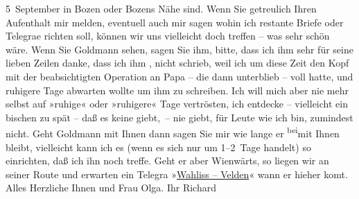 \begin{ledgroupsized}[t]{13cm}
                  5 September in Bozen oder Bozens Nähe sind.\pend
           \pstart
           {\pb}Wenn Sie getreulich Ihren
               Aufenthalt mir melden, eventuell auch mir sagen wohin ich restante Briefe oder
                  Telegra{\geminationm}e richten soll, können wir uns vielleicht doch treffen – was sehr schön wäre.\pend
           \pstart
           {\pb}Wenn Sie Goldmann sehen, sagen Sie ihm, bitte, dass ich ihm sehr für
               seine lieben Zeilen danke, dass ich ihm \label{K_L01701-1v}\label{K_L01701-1h}, nicht schrieb, weil ich um diese Zeit den Kopf mit der beabsichtigten
               Operation an Papa – die dann
               unterblieb – voll hatte, und ruhigere Tage abwarten wollte um ihm zu schreiben. Ich
               will mich aber nie mehr selbst auf »ruhige« oder »ruhigere« Tage vertrösten, ich {\pb}entdecke – vielleicht ein bischen
               zu spät – daß es keine giebt, – nie giebt, für Leute wie ich bin, zumindest
               nicht.\pend
           \pstart
           Geht Goldmann mit Ihnen dann sagen Sie mir wie
               lange er \substVorne{}\textsuperscript{bei}\substDazwischen{}mit\substHinten{} Ihnen bleibt, vielleicht kann ich es (wenn {\pb}es sich nur um 1–2 Tage handelt) so
               einrichten, daß ich ihn noch treffe. Geht er aber Wienwärts, so liegen wir an seiner Route und erwarten ein Telegra{\geminationm} »\uline{Wahliss – Velden}« wann er hieher ko{\geminationm}mt. Alles Herzliche Ihnen und
               Frau Olga.\pend
           \pstart Ihr \spacefill\mbox{Richard}\pend{}
         
         \endnumbering{}\end{ledgroupsized}  \newcommand{\dateiname}{L01701}\newcommand{\titel}{Richard Beer-Hofmann an Arthur Schnitzler, 23. 8. 1907}\newcommand{\editorInnen}{Martin Anton Müller und Gerd-Hermann Susen}
      